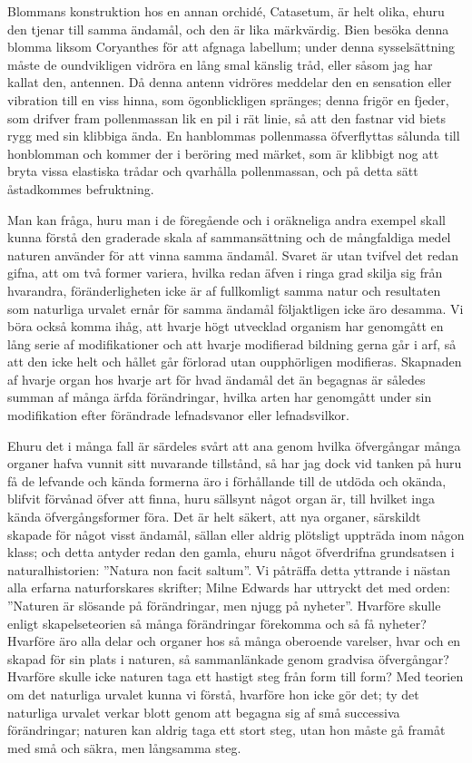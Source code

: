 Blommans konstruktion hos en annan orchidé, Catasetum, är helt olika, ehuru den tjenar till samma ändamål, och den är lika märkvärdig. Bien besöka denna blomma liksom Coryanthes för att afgnaga labellum; under denna sysselsättning måste de oundvikligen vidröra en lång smal känslig tråd, eller såsom jag har kallat den, antennen. Då denna antenn vidröres meddelar den en sensation eller vibration till en viss hinna, som ögonblickligen spränges; denna frigör en fjeder, som drifver fram pollenmassan lik en pil i rät linie, så att den fastnar vid biets rygg med sin klibbiga ända. En hanblommas pollenmassa öfverflyttas sålunda till honblomman och kommer der i beröring med märket, som är klibbigt nog att bryta vissa elastiska trådar och qvarhålla pollenmassan, och på detta sätt åstadkommes befruktning.

Man kan fråga, huru man i de föregående och i oräkneliga andra exempel skall kunna förstå den graderade skala af sammansättning och de mångfaldiga medel naturen använder för att vinna samma ändamål. Svaret är utan tvifvel det redan gifna, att om två former variera, hvilka redan äfven i ringa grad skilja sig från hvarandra, föränderligheten icke är af fullkomligt samma natur och resultaten som naturliga urvalet ernår för samma ändamål följaktligen icke äro desamma. Vi böra också komma ihåg, att hvarje högt utvecklad organism har genomgått en lång serie af modifikationer och att hvarje modifierad bildning gerna går i arf, så att den icke helt och hållet går förlorad utan oupphörligen modifieras. Skapnaden af hvarje organ hos hvarje art för hvad ändamål det än begagnas är således summan af många ärfda förändringar, hvilka arten har genomgått under sin modifikation efter förändrade lefnadsvanor eller lefnadsvilkor.

Ehuru det i många fall är särdeles svårt att ana genom hvilka öfvergångar många organer hafva vunnit sitt nuvarande tillstånd, så har jag dock vid tanken på huru få de lefvande och kända formerna äro i förhållande till de utdöda och okända, blifvit förvånad öfver att finna, huru sällsynt något organ är, till hvilket inga kända öfvergångsformer föra. Det är helt säkert, att nya organer, särskildt skapade för något visst ändamål, sällan eller aldrig plötsligt uppträda inom någon klass; och detta antyder redan den gamla, ehuru något öfverdrifna grundsatsen i naturalhistorien: ”Natura non facit saltum”. Vi påträffa detta yttrande i nästan alla erfarna naturforskares skrifter; Milne Edwards har uttryckt det med orden: ”Naturen är slösande på förändringar, men njugg på nyheter”. Hvarföre skulle enligt skapelseteorien så många förändringar förekomma och så få nyheter? Hvarföre äro alla delar och organer hos så många oberoende varelser, hvar och en skapad för sin plats i naturen, så sammanlänkade genom gradvisa öfvergångar? Hvarföre skulle icke naturen taga ett hastigt steg från form till form? Med teorien om det naturliga urvalet kunna vi förstå, hvarföre hon icke gör det; ty det naturliga urvalet verkar blott genom att begagna sig af små successiva förändringar; naturen kan aldrig taga ett stort steg, utan hon måste gå framåt med små och säkra, men långsamma steg.



